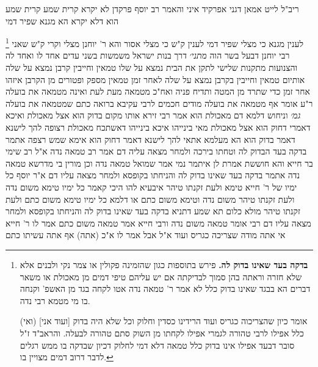 \documentclass[12pt, openany]{book}
\newcommand{\footnotecomment}[1]{
	\renewcommand\thefootnote{}
	\footnote{#1}}
\newcommand{\commenta}[1]{\footnotecomment{#1}}
\begin{document}
{ריב"ל לייט אמאן דגני אפרקיד איני והאמר רב יוסף פרקדן לא יקרא קרית שמע קרית שמע הוא דלא יקרא הא מגנא שפיר דמי 
\commenta{\textbf{בדקה בעד שאינו בדוק לה.} פירש בתוספות כגון שהזמינה פקולין או צמר נקי ולבנים אלא שלא חזרה וראתה בהן סמוך לבדיקתה אם יש עליהם טיפי דמים מן מאכולת או משאר דברים הא בבגד שאינו בדוק כלל לא אמר ר' טמאה נדה אטו לקחה בגד מן האשפ' וקנחה בו מי מטמא רבי נדה.\par (ואי) [ועוד אני] אומר כיון שהצריכוה כגריס ועוד הרידינו כסדין וחלוק וכל שלא היה בדוק כלל אפילו לרבי טהורה לגמרי אפילו לקחתו מן השוק סתם טהורה לבעלה. והראב"ד ז"ל סובר דבעד אפילו אינו בדוק כלל טמאה דלא דמי לחלוק דכיון שבדקה בו ממש רגלים לדבר דרוב דמים מצויין בו. }
לענין מגנא כי מצלי שפיר דמי לענין ק"ש כי מצלי אסור והא ר' יוחנן מצלי וקרי ק"ש שאני רבי יוחנן דבעל בשר הוה
{\large\emph{מתני׳}} דרך בנות ישראל משמשות בשני עדים אחד לו ואחד לה והצנועות מתקנות שלישי לתקן את הבית 
נמצא על שלו טמאין וחייבין קרבן נמצא על שלה אותיום טמאין וחייבין בקרבן נמצא על שלה לאחר זמן טמאין מספק ופטורים מן הקרבן 
איזהו אחר זמן כדי שתרד מן המטה ותדיח פניה ואח"כ מטמאה מעת לעת ואינה מטמאה את בועלה ר"ע אומר אף מטמאה את בועלה 
מודים חכמים לרבי עקיבא ברואה כתם שמטמאה את בועלה
{\large\emph{גמ׳}} וניחוש דלמא דם מאכולת הוא אמר רבי זירא אותו מקום בדוק הוא אצל מאכולת ואיכא דאמרי דחוק הוא אצל מאכולת 
מאי בינייהו איכא בינייהו דאשתכח מאכולת רצופה להך לישנא דאמר בדוק הוא הא מעלמא אתאי להך לישנא דאמר דחוק הוא אימא שמש רצפה 
אתמר בדקה בעד הבדוק לה וטחתו בירכה ולמחר מצאה עליה דם אמר רב טמאה נדה א"ל רב שימי בר חייא והא חוששת אמרת לן 
איתמר נמי אמר שמואל טמאה נדה וכן מורין בי מדרשא טמאה נדה 
אתמר בדקה בעד שאינו בדוק לה והניחתו בקופסא ולמחר מצאה עליו דם א"ר יוסף כל ימיו של ר' חייא טימא ולעת זקנתו טיהר 
איבעיא להו היכי קאמר כל ימיו טימא משום נדה ולעת זקנתו טיהר משום נדה וטימא משום כתם 
או דלמא כל ימיו טימא משום כתם ולעת זקנתו טיהר מולא כלום 
תא שמע דתניא בדקה בעד שאינו בדוק לה והניחתו בקופסא ולמחר מצאה עליו דם רבי אומר טמאה משום נדה ורבי חייא אמר טמאה משום כתם
אמר לו ר' חייא אי אתה מודה שצריכה כגריס ועוד א"ל אבל אמר לו א"כ (אתה) אף אתה עשיתו כתם 
}
\end{document}
